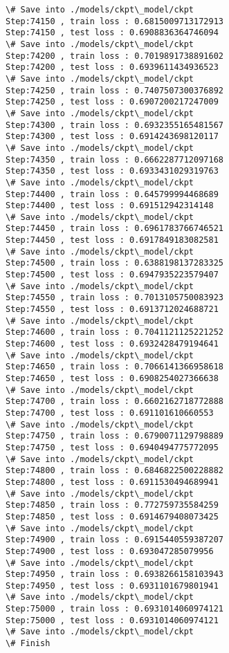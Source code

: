 \documentclass[11pt]{article}
\begin{document}
\begin{Verbatim}[commandchars=\\\{\}]
\# Save into ./models/ckpt\_model/ckpt
Step:74150 , train loss : 0.6815009713172913
Step:74150 , test loss : 0.6908836364746094
\# Save into ./models/ckpt\_model/ckpt
Step:74200 , train loss : 0.7019891738891602
Step:74200 , test loss : 0.6939611434936523
\# Save into ./models/ckpt\_model/ckpt
Step:74250 , train loss : 0.7407507300376892
Step:74250 , test loss : 0.6907200217247009
\# Save into ./models/ckpt\_model/ckpt
Step:74300 , train loss : 0.6932355165481567
Step:74300 , test loss : 0.6914243698120117
\# Save into ./models/ckpt\_model/ckpt
Step:74350 , train loss : 0.6662287712097168
Step:74350 , test loss : 0.6933431029319763
\# Save into ./models/ckpt\_model/ckpt
Step:74400 , train loss : 0.645799994468689
Step:74400 , test loss : 0.691512942314148
\# Save into ./models/ckpt\_model/ckpt
Step:74450 , train loss : 0.6961783766746521
Step:74450 , test loss : 0.6917849183082581
\# Save into ./models/ckpt\_model/ckpt
Step:74500 , train loss : 0.6388198137283325
Step:74500 , test loss : 0.6947935223579407
\# Save into ./models/ckpt\_model/ckpt
Step:74550 , train loss : 0.7013105750083923
Step:74550 , test loss : 0.6913712024688721
\# Save into ./models/ckpt\_model/ckpt
Step:74600 , train loss : 0.7041121125221252
Step:74600 , test loss : 0.6932428479194641
\# Save into ./models/ckpt\_model/ckpt
Step:74650 , train loss : 0.7066141366958618
Step:74650 , test loss : 0.6908254027366638
\# Save into ./models/ckpt\_model/ckpt
Step:74700 , train loss : 0.6602162718772888
Step:74700 , test loss : 0.691101610660553
\# Save into ./models/ckpt\_model/ckpt
Step:74750 , train loss : 0.6790071129798889
Step:74750 , test loss : 0.6940494775772095
\# Save into ./models/ckpt\_model/ckpt
Step:74800 , train loss : 0.6846822500228882
Step:74800 , test loss : 0.6911530494689941
\# Save into ./models/ckpt\_model/ckpt
Step:74850 , train loss : 0.772759735584259
Step:74850 , test loss : 0.6914679408073425
\# Save into ./models/ckpt\_model/ckpt
Step:74900 , train loss : 0.6915440559387207
Step:74900 , test loss : 0.693047285079956
\# Save into ./models/ckpt\_model/ckpt
Step:74950 , train loss : 0.6938266158103943
Step:74950 , test loss : 0.6931101679801941
\# Save into ./models/ckpt\_model/ckpt
Step:75000 , train loss : 0.6931014060974121
Step:75000 , test loss : 0.6931014060974121
\# Save into ./models/ckpt\_model/ckpt
\# Finish 

    \end{Verbatim}


    
    
    
    
\end{document}
